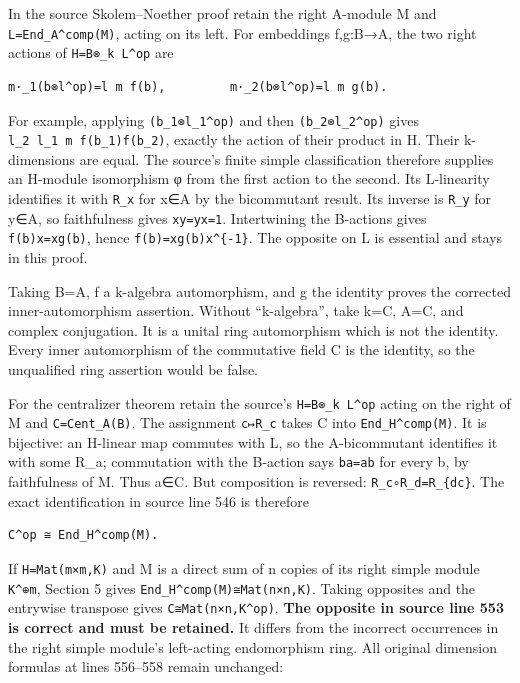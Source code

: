 \documentclass[11pt]{article}
\begin{document}
In the source Skolem--Noether proof retain the right A-module M and \texttt{L=End\_A\^{}comp(M)}, acting on its left. For embeddings f,g:B→A, the two right actions of \texttt{H=B⊗\_k\ L\^{}op} are

\begin{verbatim}
m·_1(b⊗l^op)=l m f(b),         m·_2(b⊗l^op)=l m g(b).
\end{verbatim}

For example, applying \texttt{(b\_1⊗l\_1\^{}op)} and then \texttt{(b\_2⊗l\_2\^{}op)} gives \texttt{l\_2\ l\_1\ m\ f(b\_1)f(b\_2)}, exactly the action of their product in H. Their k-dimensions are equal. The source's finite simple classification therefore supplies an H-module isomorphism φ from the first action to the second. Its L-linearity identifies it with \texttt{R\_x} for x∈A by the bicommutant result. Its inverse is \texttt{R\_y} for y∈A, so faithfulness gives \texttt{xy=yx=1}. Intertwining the B-actions gives \texttt{f(b)x=xg(b)}, hence \texttt{f(b)=xg(b)x\^{}\{-1\}}. The opposite on L is essential and stays in this proof.

Taking B=A, f a k-algebra automorphism, and g the identity proves the corrected inner-automorphism assertion. Without ``k-algebra'', take k=C, A=C, and complex conjugation. It is a unital ring automorphism which is not the identity. Every inner automorphism of the commutative field C is the identity, so the unqualified ring assertion would be false.

For the centralizer theorem retain the source's \texttt{H=B⊗\_k\ L\^{}op} acting on the right of M and \texttt{C=Cent\_A(B)}. The assignment \texttt{c↦R\_c} takes C into \texttt{End\_H\^{}comp(M)}. It is bijective: an H-linear map commutes with L, so the A-bicommutant identifies it with some R\_a; commutation with the B-action says \texttt{ba=ab} for every b, by faithfulness of M. Thus a∈C. But composition is reversed: \texttt{R\_c∘R\_d=R\_\{dc\}}. The exact identification in source line 546 is therefore

\begin{verbatim}
C^op ≅ End_H^comp(M).
\end{verbatim}

If \texttt{H=Mat(m×m,K)} and M is a direct sum of n copies of its right simple module \texttt{K\^{}⊕m}, Section 5 gives \texttt{End\_H\^{}comp(M)≅Mat(n×n,K)}. Taking opposites and the entrywise transpose gives \texttt{C≅Mat(n×n,K\^{}op)}. \textbf{The opposite in source line 553 is correct and must be retained.} It differs from the incorrect occurrences in the right simple module's left-acting endomorphism ring. All original dimension formulas at lines 556--558 remain unchanged:
\end{document}
